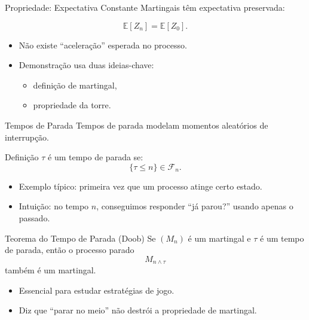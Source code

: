 \documentclass{beamer}
\begin{document}
\begin{frame}{Propriedade: Expectativa Constante}
Martingais têm expectativa preservada:

\[
   \mathbb{E}[Z_n] = \mathbb{E}[Z_0].
\]

\begin{itemize}
  \item Não existe “aceleração” esperada no processo.
  \item Demonstração usa duas ideias-chave:
  \begin{itemize}
    \item definição de martingal,
    \item propriedade da torre.
  \end{itemize}
\end{itemize}
\end{frame}

\begin{frame}{Tempos de Parada}
Tempos de parada modelam momentos aleatórios de interrupção.

\begin{block}{Definição}
$\tau$ é um tempo de parada se:
\[
   \{\tau \le n\} \in \mathcal{F}_n.
\]
\end{block}

\begin{itemize}
    \item Exemplo típico: primeira vez que um processo atinge certo estado.
    \item Intuição: no tempo $n$, conseguimos responder “já parou?” usando apenas o passado.
\end{itemize}

\end{frame}

\begin{frame}{Teorema do Tempo de Parada (Doob)}
Se $(M_n)$ é um martingal e $\tau$ é um tempo de parada, então o processo parado
\[
   M_{n \wedge \tau}
\]
também é um martingal.

\begin{itemize}
    \item Essencial para estudar estratégias de jogo.
    \item Diz que “parar no meio” não destrói a propriedade de martingal.
\end{itemize}
\end{frame}
\end{document}

